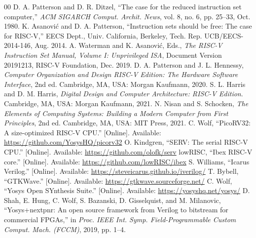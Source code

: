\documentclass[conference]{IEEEtran}
\begin{document}
\begin{thebibliography}{00}
 D. A. Patterson and D. R. Ditzel, ``The case for the
reduced instruction set computer,'' \emph{ACM SIGARCH Comput. Archit. News},
vol. 8, no. 6, pp. 25--33, Oct. 1980.
 K. Asanovi\'c and D. A. Patterson, ``Instruction sets
should be free: The case for RISC-V,'' EECS Dept., Univ. California, Berkeley,
Tech. Rep. UCB/EECS-2014-146, Aug. 2014.
 A. Waterman and K. Asanovi\'c, Eds., \emph{The RISC-V
Instruction Set Manual, Volume I: Unprivileged ISA}, Document Version
20191213, RISC-V Foundation, Dec. 2019.
 D. A. Patterson and J. L. Hennessy, \emph{Computer
Organization and Design RISC-V Edition: The Hardware Software Interface},
2nd ed. Cambridge, MA, USA: Morgan Kaufmann, 2020.
 S. L. Harris and D. M. Harris, \emph{Digital Design and
Computer Architecture: RISC-V Edition}. Cambridge, MA, USA: Morgan Kaufmann,
2021.
 N. Nisan and S. Schocken, \emph{The Elements of Computing
Systems: Building a Modern Computer from First Principles}, 2nd ed.
Cambridge, MA, USA: MIT Press, 2021.
 C. Wolf, ``PicoRV32: A size-optimized RISC-V CPU.''
[Online]. Available: \url{https://github.com/YosysHQ/picorv32}
 O. Kindgren, ``SERV: The serial RISC-V CPU.'' [Online].
Available: \url{https://github.com/olofk/serv}
 lowRISC, ``Ibex RISC-V core.'' [Online]. Available:
\url{https://github.com/lowRISC/ibex}
 S. Williams, ``Icarus Verilog.'' [Online]. Available:
\url{https://steveicarus.github.io/iverilog/}
 T. Bybell, ``GTKWave.'' [Online]. Available:
\url{https://gtkwave.sourceforge.net/}
 C. Wolf, ``Yosys Open SYnthesis Suite.'' [Online]. Available:
\url{https://yosyshq.net/yosys/}
 D. Shah, E. Hung, C. Wolf, S. Bazanski, D. Gisselquist, and
M. Milanovic, ``Yosys+nextpnr: An open source framework from Verilog to
bitstream for commercial FPGAs,'' in \emph{Proc. IEEE Int. Symp.
Field-Programmable Custom Comput. Mach. (FCCM)}, 2019, pp. 1--4.
\end{thebibliography}
\end{document}
